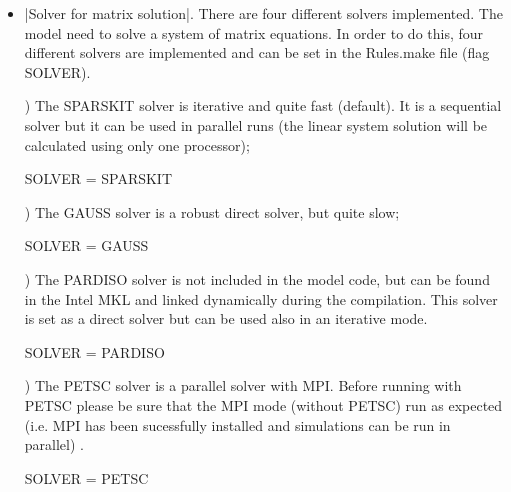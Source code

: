 \begin{itemize}
\begin{itemize}
To sum up these are the changes required in the file Rules.make to run \shy{} with the MPI option:
\begin{itemize}
 \item Set the compiler:
 \begin{codem}
  PARALLEL_MPI = NODE
 \end{codem}
 \item Set the partitioner:
 \begin{codem}
  PARTS = METIS
 \end{codem}
 \item Set the path where |METIS| is installed:
  \begin{codem}
  METISDIR = HOME/lib/metis
  \end{codem}
 or another path
\end{itemize}
%

To run shyfem in parallel with MPI, use:
\begin{codem}
mpirun -np 4 path_to_shyfem/shyfem str-file.str
\end{codem}
where np set the number of processes to run (above 4 are used) which corresponds
to the number of domain partitions.

\end{itemize}

\item |Solver for matrix solution|. There are four different solvers implemented.
The model need to solve a system of matrix equations. In order to do this, four different
solvers are implemented and can be set in the Rules.make file (flag SOLVER).

) The SPARSKIT solver is iterative and quite fast (default). It is a sequential solver but it can be used in parallel runs (the linear system solution will be calculated using only one processor);
\begin{codem}
SOLVER = SPARSKIT
\end{codem}
) The GAUSS solver is a robust direct solver, but quite slow;
\begin{codem}
SOLVER = GAUSS
\end{codem}
) The PARDISO solver is not included in the model code, but can be found in the Intel MKL and linked dynamically during the compilation. This solver is set as a direct solver but can be used also in an iterative mode.
\begin{codem}
SOLVER = PARDISO
\end{codem}
) The PETSC solver is a parallel solver with MPI.
Before running \shy{} with PETSC please be sure that the MPI mode (without PETSC)
run as expected (i.e. MPI has been sucessfully installed and simulations can be run in parallel) .
\begin{codem}
SOLVER = PETSC
\end{codem}


\end{itemize}
